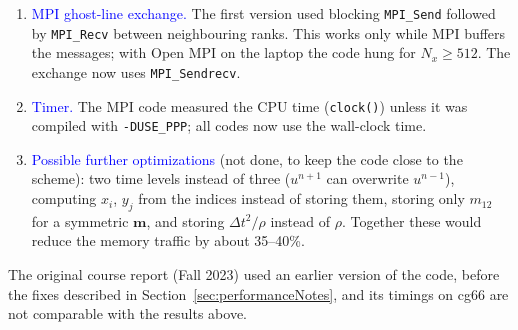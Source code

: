 \documentclass[11pt]{article}
\begin{document}
\begin{enumerate}
\item \textcolor{blue}{MPI ghost-line exchange.} The first version used blocking \texttt{MPI\_Send} followed by \texttt{MPI\_Recv} between neighbouring ranks. This works only while MPI buffers the messages; with Open MPI on the laptop the code hung for $N_x\geq 512$. The exchange now uses \texttt{MPI\_Sendrecv}.
\item \textcolor{blue}{Timer.} The MPI code measured the CPU time (\texttt{clock()}) unless it was compiled with \texttt{-DUSE\_PPP}; all codes now use the wall-clock time.
\item \textcolor{blue}{Possible further optimizations} (not done, to keep the code close to the scheme): two time levels instead of three ($u^{n+1}$ can overwrite $u^{n-1}$), computing $x_i$, $y_j$ from the indices instead of storing them, storing only $m_{12}$ for a symmetric $\bm{m}$, and storing $\Delta t^2/\rho$ instead of $\rho$. Together these would reduce the memory traffic by about 35--40\%.
\end{enumerate}

The original course report (Fall 2023) used an earlier version of the code, before the fixes described in Section~\ref{sec:performanceNotes}, and its timings on cg66 are not comparable with the results above.
\end{document}
